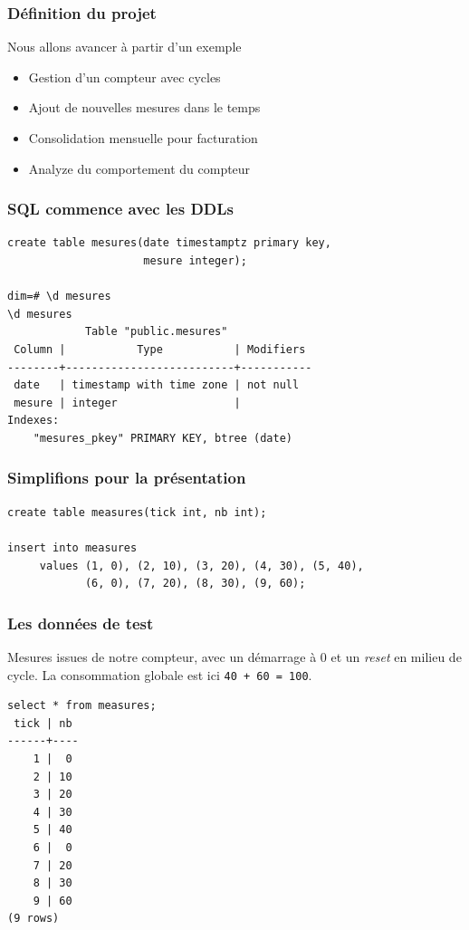 \documentclass{beamer}
\begin{document}
\begin{frame}[fragile]
  \frametitle{Définition du projet}

  Nous allons avancer à partir d'un exemple

  \begin{itemize}
    \item<1-> Gestion d'un compteur avec cycles
    \item<2-> Ajout de nouvelles mesures dans le temps
    \item<3-> Consolidation mensuelle pour facturation
    \item<4-> Analyze du comportement du compteur
  \end{itemize}
\end{frame}

\begin{frame}[fragile]
  \frametitle{SQL commence avec les DDLs}

  \linebreak

\begin{example}[DDL]
\begin{verbatim}
create table mesures(date timestamptz primary key,
                     mesure integer);

dim=# \d mesures
\d mesures
            Table "public.mesures"
 Column |           Type           | Modifiers 
--------+--------------------------+-----------
 date   | timestamp with time zone | not null
 mesure | integer                  | 
Indexes:
    "mesures_pkey" PRIMARY KEY, btree (date)
\end{verbatim}
\end{example}
\end{frame}

\begin{frame}[fragile]
  \frametitle{Simplifions pour la présentation}

\begin{verbatim}
create table measures(tick int, nb int);

insert into measures
     values (1, 0), (2, 10), (3, 20), (4, 30), (5, 40),
            (6, 0), (7, 20), (8, 30), (9, 60);
\end{verbatim}
\end{frame}

\begin{frame}[fragile]
  \frametitle{Les données de test}

  Mesures issues de notre compteur, avec un démarrage à 0 et un
  \textit{reset} en milieu de cycle. La consommation globale est ici
  \alert{\texttt{40 + 60 = 100}}.

\begin{verbatim}
select * from measures;
 tick | nb 
------+----
    1 |  0
    2 | 10
    3 | 20
    4 | 30
    5 | 40
    6 |  0
    7 | 20
    8 | 30
    9 | 60
(9 rows)
\end{verbatim}
\end{frame}
\end{document}
